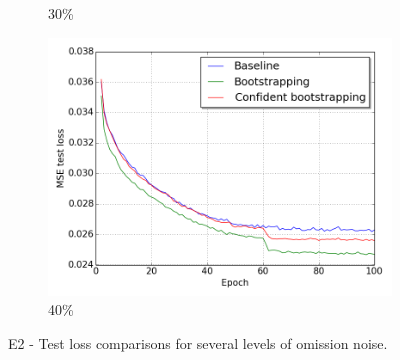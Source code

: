 \begin{figure}[H]
\begin{subfigure}{0.31\textwidth}
\caption{ 30\%} \label{fig:app_E2_3_lc}
\vspace{-0.1cm} %
\end{subfigure}
\hspace*{\fill} %
\begin{subfigure}{0.31\textwidth}
\includegraphics[width=\textwidth]{figs/E2/lc_4.png}
\caption{40\%} \label{fig:app_E2_4_lc}
\vspace{-0.1cm} %
\end{subfigure}
\vspace{-0.6\baselineskip}
\caption[E2 - Test loss comparisons for several levels of omission noise]{E2 - Test loss comparisons for several levels of omission noise.} \label{fig:E2_all_lc}
\end{figure}
\vspace{-0.7cm}
